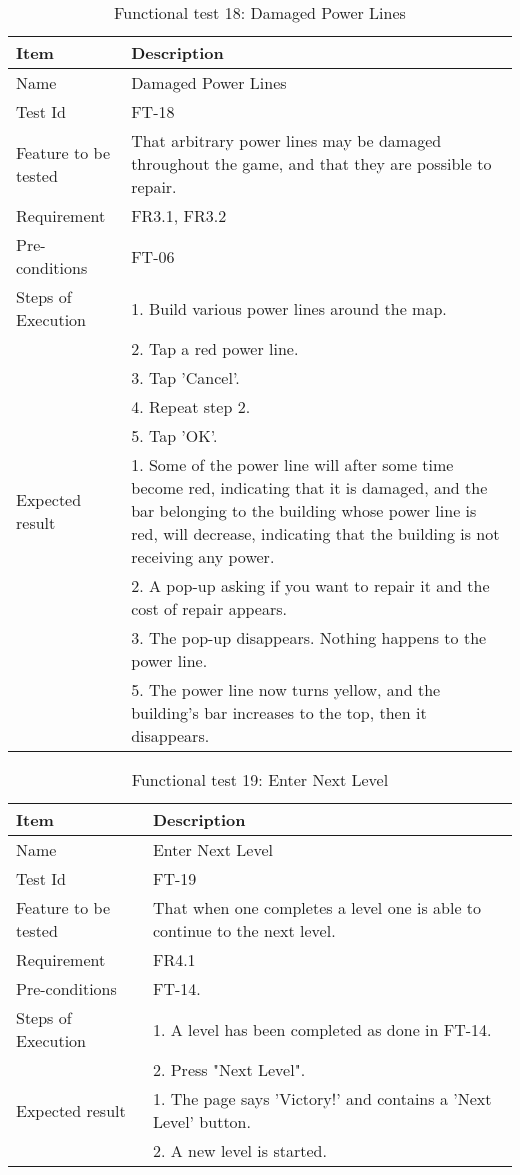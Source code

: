 \begin{table}[H]
\centering
	\begin{tabular}{ l | p{8cm} }
		\hline
		\rowcolor{lightgray}
		{\bf Item} & {\bf Description} \\ \hline
		Name & Damaged Power Lines \\ 
		Test Id & FT-18 \\ 
		Feature to be tested & That arbitrary power lines may be damaged throughout the game, and that they are possible to repair. \\ 
		Requirement & FR3.1, FR3.2  \\ 
		Pre-conditions & FT-06 \\ 
		Steps of Execution & 1. Build various power lines around the map. \\ 
		& 2. Tap a red power line. \\
		& 3. Tap 'Cancel'. \\
		& 4. Repeat step 2. \\
		& 5. Tap 'OK'. \\
		Expected result & 1. Some of the power line will after some time become red, indicating that it is damaged, and the bar belonging to the building whose power line is red, will decrease, indicating that the building is not receiving any power. \\
		& 2. A pop-up asking if you want to repair it and the cost of repair appears. \\
		& 3. The pop-up disappears. Nothing happens to the power line. \\
		& 5. The power line now turns yellow, and the building's bar increases to the top, then it disappears. \\
		\hline
	\end{tabular}
	\caption{Functional test 18: Damaged Power Lines}
\end{table}

\begin{table}[H]
\centering
	\begin{tabular}{ l | p{8cm} }
		\hline
		\rowcolor{lightgray}
		{\bf Item} & {\bf Description} \\ \hline
		Name & Enter Next Level \\ 
		Test Id & FT-19 \\ 
		Feature to be tested & That when one completes a level one is able to continue to the next level. \\ 
		Requirement & FR4.1 \\ 
		Pre-conditions & FT-14.\\ 
		Steps of Execution & 1. A level has been completed as done in FT-14.\\
		& 2. Press "Next Level". \\
		Expected result & 1. The page says 'Victory!' and contains a 'Next Level' button. \\
		& 2. A new level is started. \\
		\hline
	\end{tabular}
	\caption{Functional test 19: Enter Next Level}
\end{table}

